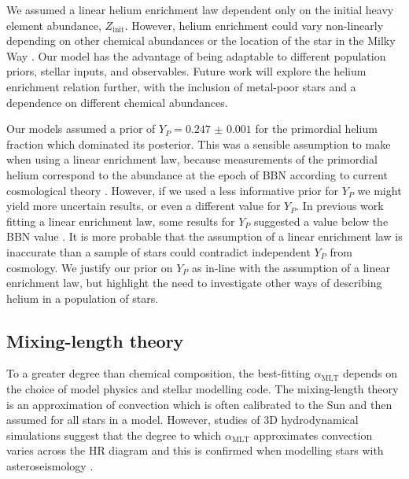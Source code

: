 \documentclass[fleqn,usenatbib]{mnras}
\newcommand{\mlt}{\ensuremath{{\alpha_\mathrm{MLT}}}}
\begin{document}
We assumed a linear helium enrichment law dependent only on the initial heavy element abundance, $Z_\mathrm{init}$. However, helium enrichment could vary non-linearly depending on other chemical abundances \citep{West.Heger2013} or the location of the star in the Milky Way \citep{Frebel2010}. Our model has the advantage of being adaptable to different population priors, stellar inputs, and observables. Future work will explore the helium enrichment relation further, with the inclusion of metal-poor stars and a dependence on different chemical abundances.

Our models assumed a prior of $Y_P = \num{0.247(1)}$ for the primordial helium fraction which dominated its posterior. This was a sensible assumption to make when using a linear enrichment law, because measurements of the primordial helium correspond to the abundance at the epoch of BBN according to current cosmological theory \citep{Cyburt.Fields.ea2016}. However, if we used a less informative prior for $Y_P$ we might yield more uncertain results, or even a different value for $Y_P$. In previous work fitting a linear enrichment law, some results for $Y_P$ suggested a value below the BBN value \citep{Casagrande.Flynn.ea2007, SilvaAguirre.Lund.ea2017}. It is more probable that the assumption of a linear enrichment law is inaccurate than a sample of stars could contradict independent $Y_P$ from cosmology. We justify our prior on $Y_P$ as in-line with the assumption of a linear enrichment law, but highlight the need to investigate other ways of describing helium in a population of stars.

\subsection{Mixing-length theory}\label{sec:mlt}

To a greater degree than chemical composition, the best-fitting $\mlt$ depends on the choice of model physics and stellar modelling code. The mixing-length theory is an approximation of convection which is often calibrated to the Sun and then assumed for all stars in a model. However, studies of 3D hydrodynamical simulations suggest that the degree to which $\mlt$ approximates convection varies across the HR diagram \citep{Magic.Weiss.ea2015} and this is confirmed when modelling stars with asteroseismology \citep{Tayar.Somers.ea2017}.
\end{document}
